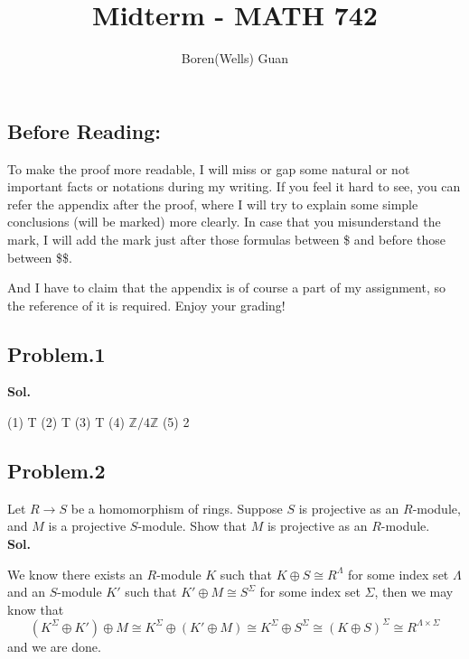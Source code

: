 \documentclass[lang=en,11pt,a4paper,citestyle =authoryear]{elegantpaper}
\title{Midterm - MATH 742}
\author{Boren(Wells) Guan}
\begin{document}
\maketitle

\subsection*{Before Reading:}\par
To make the proof more readable, I will miss or gap some natural or not important facts or notations during my writing. If you feel it hard to see, you can refer the appendix after the proof, where I will try to explain some simple conclusions (will be marked) more clearly. In case that you misunderstand the mark, I will add the mark just after those formulas between \$ and before those between \$\$.\par
And I have to claim that the appendix is of course a part of my assignment, so the reference of it is required. Enjoy your grading!

\subsection*{Problem.1}
\vspace{0.5em}
\textbf{Sol.} \par
(1) T (2) T (3) T (4) $\mathbb{Z}/4\mathbb{Z}$ (5) 2
\par 
\vspace{0.5em}

\subsection*{Problem.2} 
Let $R\to S$ be a homomorphism of rings. Suppose $S$ is projective as an $R$-module, and $M$ is a projective $S$-module. Show that $M$ is projective as an $R$-module.
\vspace{0.5em}\\
\textbf{Sol.} \par
    We know there exists an $R$-module $K$ such that $K\oplus S \cong R^{\Lambda}$ for some index set $\Lambda$ and an $S$-module $K'$ such that $K'\oplus M \cong S^{\Sigma}$ for some index set $\Sigma$, then we may know that \[(K^{\Sigma} \oplus K')\oplus M \cong K^{\Sigma} \oplus (K'\oplus M) \cong K^{\Sigma} \oplus S^{\Sigma} \cong (K\oplus S)^{\Sigma} \cong R^{\Lambda \times \Sigma}\] 
    and we are done.
\par 
\vspace{0.5em}
\end{document}
